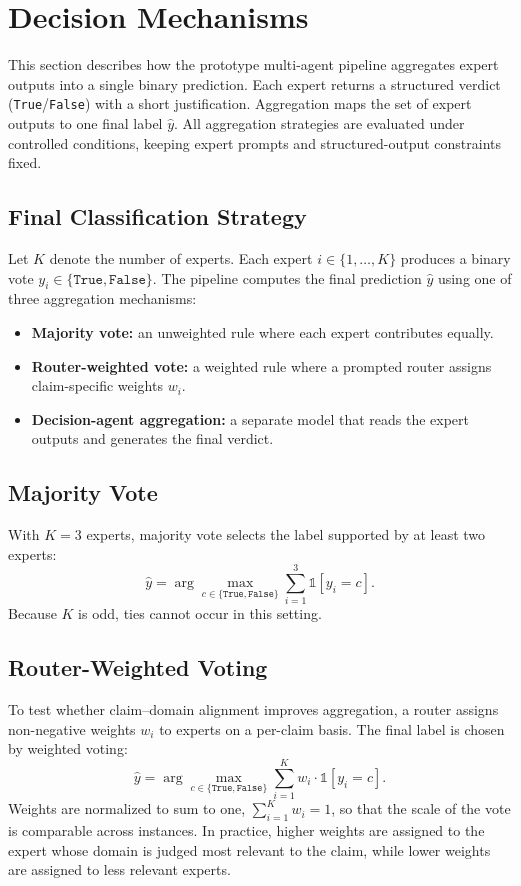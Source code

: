 \section{Decision Mechanisms}

This section describes how the prototype multi-agent pipeline aggregates expert outputs into a single binary prediction.
Each expert returns a structured verdict (\texttt{True}/\texttt{False}) with a short justification.
Aggregation maps the set of expert outputs to one final label $\hat{y}$.
All aggregation strategies are evaluated under controlled conditions, keeping expert prompts and structured-output constraints fixed.

\subsection{Final Classification Strategy}
Let $K$ denote the number of experts. Each expert $i \in \{1,\dots,K\}$ produces a binary vote
$y_i \in \{\texttt{True},\texttt{False}\}$.
The pipeline computes the final prediction $\hat{y}$ using one of three aggregation mechanisms:
\begin{itemize}
    \item \textbf{Majority vote:} an unweighted rule where each expert contributes equally.
    \item \textbf{Router-weighted vote:} a weighted rule where a prompted router assigns claim-specific weights $w_i$.
    \item \textbf{Decision-agent aggregation:} a separate model that reads the expert outputs and generates the final verdict.
\end{itemize}

\subsection{Majority Vote}
With $K=3$ experts, majority vote selects the label supported by at least two experts:
\[
\hat{y} = \arg\max_{c \in \{\texttt{True},\texttt{False}\}} \sum_{i=1}^{3} \mathbb{1}[y_i = c].
\]
Because $K$ is odd, ties cannot occur in this setting.

\subsection{Router-Weighted Voting}
To test whether claim--domain alignment improves aggregation, a router assigns non-negative weights $w_i$ to experts on a per-claim basis. The final label is chosen by weighted voting:
\[
\hat{y} = \arg\max_{c \in \{\texttt{True},\texttt{False}\}} \sum_{i=1}^{K} w_i \cdot \mathbb{1}[y_i = c].
\]
Weights are normalized to sum to one, $\sum_{i=1}^{K} w_i = 1$, so that the scale of the vote is comparable across instances. In practice, higher weights are assigned to the expert whose domain is judged most relevant to the claim, while lower weights are assigned to less relevant experts.

